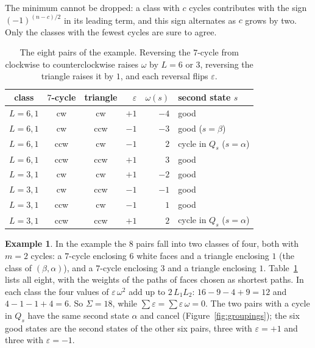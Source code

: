 \documentclass[10pt]{amsart}
\numberwithin{equation}{section}
\theoremstyle{definition}
\newtheorem{example}[equation]{Example}
\theoremstyle{remark}
\newcommand{\eps}{\varepsilon}
\begin{document}
The minimum cannot be dropped: a class with $c$ cycles contributes with the sign $(-1)^{(n-c)/2}$ in its leading term, and this sign alternates as $c$ grows by two.
Only the classes with the fewest cycles are sure to agree.

\begin{table}[!htb]
\centering
\begin{tabular}{@{}cccrrl@{}}
\toprule
class & $7$-cycle & triangle & $\eps$ & $\omega(s)$ & second state $s$ \\
\midrule
$L=6,1$ & cw & cw & $+1$ & $-4$ & good \\
$L=6,1$ & cw & ccw & $-1$ & $-3$ & good ($s=\beta$) \\
$L=6,1$ & ccw & cw & $-1$ & $2$ & cycle in $Q_s$ ($s=\alpha$) \\
$L=6,1$ & ccw & ccw & $+1$ & $3$ & good \\
\midrule
$L=3,1$ & cw & cw & $+1$ & $-2$ & good \\
$L=3,1$ & cw & ccw & $-1$ & $-1$ & good \\
$L=3,1$ & ccw & cw & $-1$ & $1$ & good \\
$L=3,1$ & ccw & ccw & $+1$ & $2$ & cycle in $Q_s$ ($s=\alpha$) \\
\bottomrule
\end{tabular}
\vspace{4pt}
\caption{The eight pairs of the example. Reversing the $7$-cycle from clockwise to counterclockwise raises $\omega$ by $L=6$ or $3$, reversing the triangle raises it by $1$, and each reversal flips $\eps$.}
\label{tab:pairs}
\end{table}


\begin{example}\label{ex:count}
In the example the $8$ pairs fall into two classes of four, both with $m=2$ cycles: a $7$-cycle enclosing $6$ white faces and a triangle enclosing $1$ (the class of $(\beta,\alpha)$), and a $7$-cycle enclosing $3$ and a triangle enclosing $1$.
Table~\ref{tab:pairs} lists all eight, with the weights of the paths of faces chosen as shortest paths.
In each class the four values of $\eps\,\omega^2$ add up to $2\,L_1L_2$: $16-9-4+9=12$ and $4-1-1+4=6$.
So $\Sigma=18$, while $\sum\eps=\sum\eps\,\omega=0$.
The two pairs with a cycle in $Q_s$ have the same second state $\alpha$ and cancel (Figure~\ref{fig:groupings}); the six good states are the second states of the other six pairs, three with $\eps=+1$ and three with $\eps=-1$.
\end{example}
\end{document}
